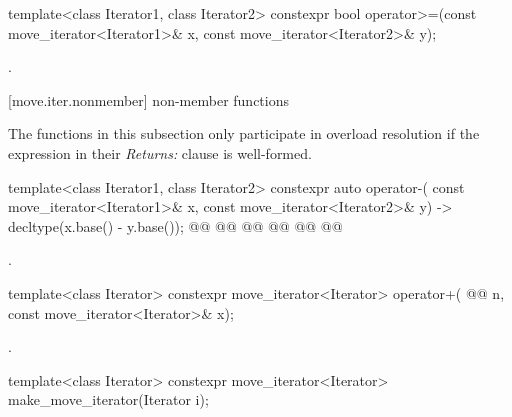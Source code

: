 %
\begin{itemdecl}
template<class Iterator1, class Iterator2>
constexpr bool operator>=(const move_iterator<Iterator1>& x, const move_iterator<Iterator2>& y);
\end{itemdecl}

\begin{itemdescr}
\pnum
\returns {}.
\end{itemdescr}

[move.iter.nonmember]{ non-member functions}

\begin{addedblock}
\pnum
The functions in this subsection only participate in overload resolution if the
expression in their \textit{Returns:} clause is well-formed.
\end{addedblock}

%
\begin{itemdecl}
template<class Iterator1, class Iterator2>
    constexpr auto operator-(
    const move_iterator<Iterator1>& x,
    const move_iterator<Iterator2>& y) -> decltype(x.base() - y.base());
@@
@@
    @@
@@
@@
    @@
\end{itemdecl}

\begin{itemdescr}
\pnum
\returns {}.
\end{itemdescr}

%
\begin{itemdecl}
template<class Iterator>
  constexpr move_iterator<Iterator> operator+(
    @@ n,
    const move_iterator<Iterator>& x);
\end{itemdecl}

\begin{itemdescr}
\pnum
\returns {}.
\end{itemdescr}

%
\begin{itemdecl}
template<class Iterator>
constexpr move_iterator<Iterator> make_move_iterator(Iterator i);
\end{itemdecl}

